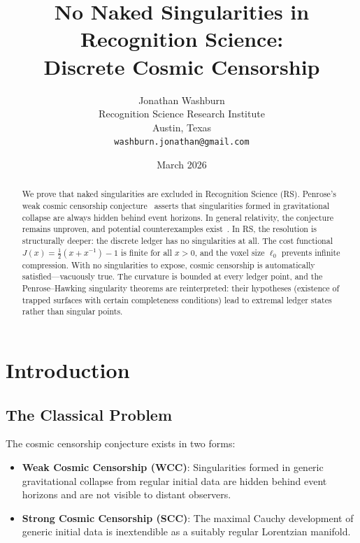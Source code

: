 \documentclass[12pt,a4paper]{article}
\title{No Naked Singularities in Recognition Science:\\
Discrete Cosmic Censorship}
\author{Jonathan Washburn\\
Recognition Science Research Institute\\
Austin, Texas\\
\texttt{washburn.jonathan@gmail.com}}
\date{March 2026}
\theoremstyle{definition}
\theoremstyle{remark}
\begin{document}
\maketitle

\begin{abstract}
We prove that naked singularities are excluded in Recognition Science
(RS).  Penrose's weak cosmic censorship conjecture~\cite{Penrose1969}
asserts that singularities formed in gravitational collapse are always
hidden behind event horizons.  In general relativity, the conjecture
remains unproven, and potential counterexamples
exist~\cite{Christodoulou1994}.  In RS, the resolution is
structurally deeper: the discrete ledger has no singularities at all.
The cost functional $J(x) = \tfrac{1}{2}(x + x^{-1}) - 1$ is finite
for all $x > 0$, and the voxel size $\ell_0$ prevents infinite
compression.  With no singularities to expose, cosmic censorship is
automatically satisfied---vacuously true.  The curvature is bounded at
every ledger point, and the Penrose--Hawking singularity theorems are
reinterpreted: their hypotheses (existence of trapped surfaces with
certain completeness conditions) lead to extremal ledger states rather
than singular points.
\end{abstract}

\section{Introduction}

\subsection{The Classical Problem}

The cosmic censorship conjecture exists in two forms:

\begin{itemize}
  \item \textbf{Weak Cosmic Censorship (WCC)}: Singularities formed
  in generic gravitational collapse from regular initial data are
  hidden behind event horizons and are not visible to distant
  observers.

  \item \textbf{Strong Cosmic Censorship (SCC)}: The maximal Cauchy
  development of generic initial data is inextendible as a suitably
  regular Lorentzian manifold.
\end{itemize}
\end{document}
